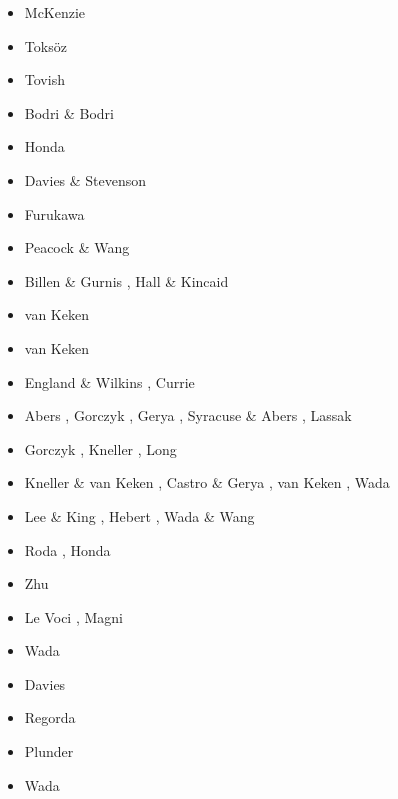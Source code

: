 \begin{scriptsize}
\begin{itemize}
\item[\nineteensixtynine] McKenzie \cite{mcke69}
\item[\nineteenseventyone] Toks{\"o}z \etal \cite{tomj71}
\item[\nineteenseventyeight] Tovish \etal \cite{tosl78}
\item[\nineteenseventynine] Bodri \& Bodri \cite{bobo79}
\item[\nineteeneightyfive] Honda \cite{hond85}
\item[\nineteenninetytwo] Davies \& Stevenson \cite{dast92}
\item[\nineteenninetythree] Furukawa \cite{furu93}
\item[\nineteenninetynine] Peacock \& Wang \cite{pewa99}
\item[\twothousandone] Billen \& Gurnis \cite{bigu01}, Hall \& Kincaid \cite{haki01}
\item[\twothousandtwo] van Keken \etal \cite{vakp02}
\item[\twothousandthree] van Keken \cite{vank03}
\item[\twothousandfour] England \& Wilkins \cite{enwi04}, Currie \etal \cite{cuwh04}
\item[\twothousandsix] Abers \etal \cite{abvk06}, Gorczyk \etal \cite{gogc06},
                       Gerya \etal \cite{gecy06}, Syracuse \& Abers \cite{syab06},
                       Lassak \etal \cite{lafh06}
\item[\twothousandseven] Gorczyk \etal \cite{gogc07}, Kneller \etal \cite{knvk07}, Long \etal \cite{lohd07}
\item[\twothousandeight] Kneller \& van Keken \cite{knva08}, Castro \& Gerya \cite{cage08}, 
                         van Keken \etal \cite{vack08}, Wada \etal \cite{wawh08}
\item[\twothousandnine] Lee \& King \cite{leki09}, Hebert \etal \cite{heaa09},
                        Wada \& Wang \cite{wawa09}
\item[\twothousandten] Roda \etal \cite{roms10}, Honda \etal \cite{hogz10} 
\item[\twothousandeleven] Zhu \etal \cite{zhgh11}
\item[\twothousandfourteen] Le Voci \etal \cite{ledg14}, Magni \etal \cite{mabv14}
\item[\twothousandfourteen] Wada \etal \cite{wahh15}
\item[\twothousandsixteen] Davies \etal \cite{dalg16} 
\item[\twothousandseventeen] Regorda \etal \cite{rerm17}
\item[\twothousandeighteen] Plunder \etal \cite{pltv18}
\item[\twothousandtwentyone] Wada \cite{wada21}
\end{itemize}
\end{scriptsize}

